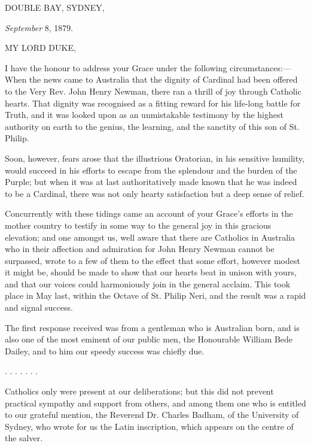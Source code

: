 
DOUBLE BAY, SYDNEY,

\emph{September} 8, 1879.

MY LORD DUKE,

I have the honour to address your Grace under the following
circumstances:—When the news came to Australia that the dignity of
Cardinal had been offered to the Very Rev. John Henry Newman, there
ran a thrill of joy through Catholic hearts. That dignity was
recognised as a fitting reward for his life-long battle for Truth, and
it was looked upon as an unmistakable testimony by the highest
authority on earth to the genius, the learning, and the sanctity of
this son of St. Philip.

Soon, however, fears arose that the illustrious Oratorian, in his
sensitive humility, would succeed in his efforts to escape from the
splendour and the burden of the Purple; but when it was at last
authoritatively made known that he was indeed to be a Cardinal, there
was not only hearty satisfaction but a deep sense of relief.

Concurrently with these tidings came an account of your Grace's
efforts in the mother country to testify in some way to the general
joy in this gracious elevation; and one amongst us, well aware that
there are Catholics in Australia who in their affection and admiration
for John Henry Newman cannot be surpassed, wrote to a few of them to
the effect that some effort, however modest it might be, should be
made to show that our hearts beat in unison with yours, and that our
voices could harmoniously join in the general acclaim. This took
place in May last, within the Octave of St. Philip Neri, and the
result was a rapid and signal success.

The first response received was from a gentleman who is Australian
born, and is also one of the most eminent of our public men, the
Honourable William Bede Dailey, and to him our speedy success was
chiefly due.

.
. .
. .
. .

Catholics only were present at our deliberations; but this did not
prevent practical sympathy and support from others, and among them one
who is entitled to our grateful mention, the Reverend Dr. Charles
Badham, of the University of Sydney, who wrote for us the Latin
inscription, which appears on the centre of the salver.

